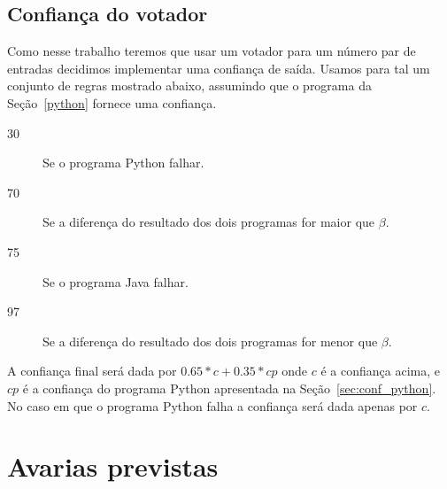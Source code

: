 \documentclass[a4paper,10pt]{article}
\begin{document}
\subsection{Confiança do votador}
Como nesse trabalho teremos que usar um votador para um número par de entradas
decidimos implementar uma confiança de saída. Usamos para tal um conjunto de
regras mostrado abaixo, assumindo que o programa da Seção~\ref{python} fornece
uma confiança.

\begin{description}
	\item[30] Se o programa Python falhar.
	\item[70] Se a diferença do resultado dos dois programas for maior que
		$\beta$.
	\item[75] Se o programa Java falhar.
	\item[97] Se a diferença do resultado dos dois programas for menor que
		$\beta$.
\end{description}

A confiança final será dada por $0.65 * c + 0.35 * cp$ onde $c$ é a confiança
acima, e $cp$ é a confiança do programa Python apresentada na
Seção~\ref{sec:conf_python}. No caso em que o programa Python falha a confiança
será dada apenas por $c$.

\section{Avarias previstas}
\end{document}
